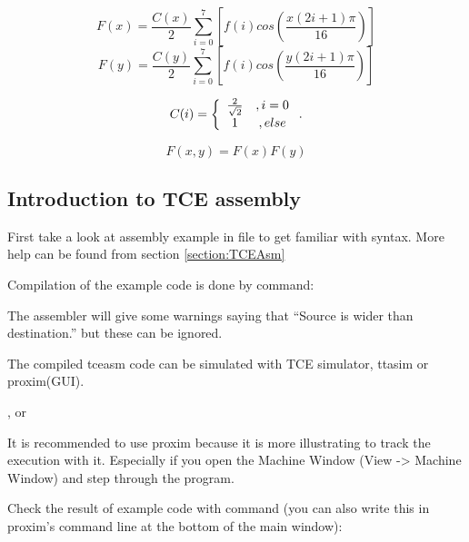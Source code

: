 \documentclass[twoside]{tceusermanual}
\begin{document}
\begin{equation}
F(x) = \frac{C(x)}{2}\sum_{i = 0}^7 \left[f(i)cos\left(\frac{x
\left(2i+1\right)\pi}{16}\right)\right] \nonumber
\end{equation}
\begin{equation}
F(y) = \frac{C(y)}{2}\sum_{i = 0}^7 \left[f(i)cos\left(\frac{y
\left(2i+1\right)\pi}{16}\right)\right] \nonumber
\end{equation}

\begin{equation}
C(i) = 
\left\{
\begin{array}{c c}
\frac{2}{\sqrt2} &,  i = 0 \\
1 &,  else 
\end{array} \right . . \nonumber
\end{equation}

\begin{equation}
F(x,y) = F(x)F(y) \nonumber
\end{equation}

\subsection{Introduction to TCE assembly}

First take a look at assembly example in file 
to get familiar with syntax. More help can be found from
section \ref{section:TCEAsm}

Compilation of the example code is done by command:


The assembler will give some warnings saying that ``Source is
wider than destination.'' but these can be ignored.

The compiled tceasm code can be simulated with TCE
simulator, ttasim or proxim(GUI).

 , or


It is recommended to use proxim because it is more illustrating to track the
execution with it. Especially if you open the Machine Window (View -> Machine
Window) and step through the program.

Check the result of example code with command (you can also write this in
proxim's command line at the bottom of the main window):
\end{document}
